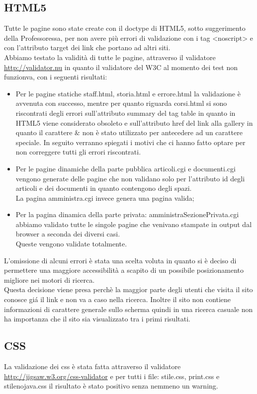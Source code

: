 \subsection{HTML5}
Tutte le pagine sono state create con il doctype di HTML5, sotto suggerimento della Professoressa,  per non avere pi\`u errori di validazione con i tag <noscript> e con l'attributo target dei link che portano ad altri siti.
\\ Abbiamo testato la validit\`a di tutte le pagine, attraverso il validatore \href{http://validator.nu}{http://validator.nu} in quanto il validatore del W3C al momento dei test non funzionva, con i seguenti risultati:
\begin{itemize}
	\item Per le pagine statiche staff.html, storia.html e errore.html la validazione \`e avvenuta con successo, mentre per quanto riguarda corsi.html si sono riscontrati degli errori sull'attributo summary del tag table in quanto in HTML5 viene considerato obsoleto e sull'attributo href del link alla gallery in quanto il carattere \& non \`e stato utilizzato per antecedere ad un carattere speciale. In seguito verranno spiegati i motivi che ci hanno fatto optare per non correggere tutti gli errori riscontrati.
	\item Per le pagine dinamiche della parte pubblica articoli.cgi e documenti.cgi vengono generate delle pagine che non validano solo per l'attributo id degli articoli e dei documenti in quanto contengono degli spazi.
	\\La pagina amministra.cgi invece genera una pagina valida;
	\item Per la pagina dinamica della parte privata: amministraSezionePrivata.cgi abbiamo validato tutte le singole pagine che venivano stampate in output dal browser a seconda dei diversi casi.
	\\ Queste vengono validate totalmente. 
\end{itemize}
L'omissione di alcuni errori \`e stata una scelta voluta in quanto si \`e deciso di permettere una maggiore accessibilit\`a a scapito di un possibile posizionamento migliore nei motori di ricerca.
\\  Questa decisione viene presa perch\`e la maggior parte degli utenti che visita il sito conosce gi\'a il link  e non va a caso nella ricerca. Inoltre il sito non contiene informazioni di carattere generale sullo scherma quindi in una ricerca casuale non ha importanza che il sito sia visualizzato tra i primi risultati.

\subsection{CSS}
La validazione dei css \`e stata fatta attraverso il validatore 
\href{http://jigsaw.w3.org/css-validator}{http://jigsaw.w3.org/css-validator}
e per tutti i file: stile.css, print.css e stilenojava.css il risultato \`e stato positivo senza nemmeno un warning.
 
